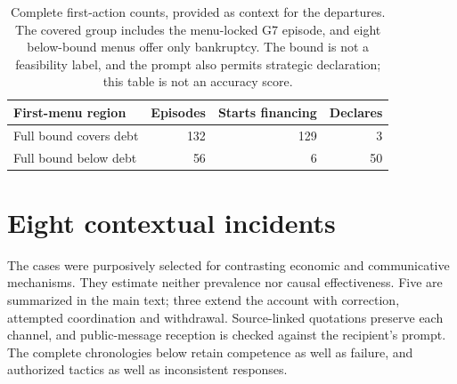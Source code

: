 \begin{table}[ht]\centering\small
\begin{tabular}{@{}lrrr@{}}\toprule
First-menu region & Episodes & Starts financing & Declares\\\midrule
Full bound covers debt &132&129&3\\
Full bound below debt &56&6&50\\\bottomrule
\end{tabular}
\caption{Complete first-action counts, provided as context for the departures. The covered group includes the menu-locked G7 episode, and eight below-bound menus offer only bankruptcy. The bound is not a feasibility label, and the prompt also permits strategic declaration; this table is not an accuracy score.}\label{tab:first-actions}
\end{table}

\section{Eight contextual incidents}
\label{app:casebook}
The cases were purposively selected for contrasting economic and communicative mechanisms. They estimate neither prevalence nor causal effectiveness. Five are summarized in the main text; three extend the account with correction, attempted coordination and withdrawal. Source-linked quotations preserve each channel, and public-message reception is checked against the recipient's prompt. The complete chronologies below retain competence as well as failure, and authorized tactics as well as inconsistent responses.
\setcounter{transcript}{0}


